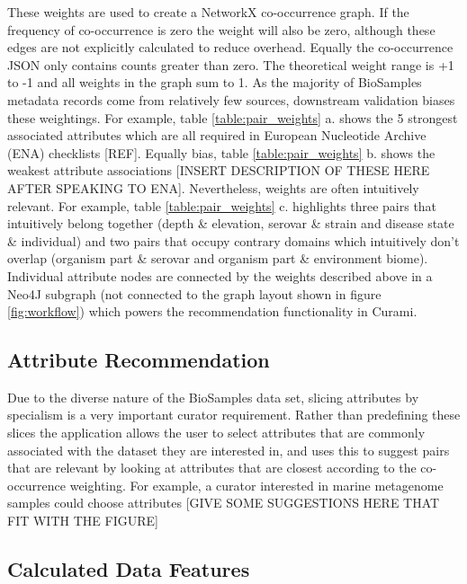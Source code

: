\documentclass{bmcart}
\begin{document}
These weights are used to create a NetworkX co-occurrence graph. If the frequency of co-occurrence is zero the weight will also be zero, although these edges are not explicitly calculated to reduce overhead. Equally the co-occurrence JSON only contains counts greater than zero. The theoretical weight range is +1 to -1 and all weights in the graph sum to 1. As the majority of BioSamples metadata records come from relatively few sources, downstream validation biases these weightings. For example, table \ref{table:pair_weights} a. shows the 5 strongest associated attributes which are all required in European Nucleotide Archive (ENA) checklists [REF]. Equally bias, table \ref{table:pair_weights} b. shows the weakest attribute associations [INSERT DESCRIPTION OF THESE HERE AFTER SPEAKING TO ENA]. Nevertheless, weights are often intuitively relevant. For example, table \ref{table:pair_weights} c. highlights three pairs that intuitively belong together (depth \& elevation, serovar \& strain and disease state \& individual) and two pairs that occupy contrary domains which intuitively don't overlap (organism part \& serovar and organism part \& environment biome). Individual attribute nodes are connected by the weights described above in a Neo4J subgraph (not connected to the graph layout shown in figure \ref{fig:workflow}) which powers the recommendation functionality in Curami.

\subsection*{Attribute Recommendation}

Due to the diverse nature of the BioSamples data set, slicing attributes by specialism is a very important curator requirement. Rather than predefining these slices the application allows the user to select attributes that are commonly associated with the dataset they are interested in, and uses this to suggest pairs that are relevant by looking at attributes that are closest according to the co-occurrence weighting. For example, a curator interested in marine metagenome samples could choose attributes [GIVE SOME SUGGESTIONS HERE THAT FIT WITH THE FIGURE]



\subsection*{Calculated Data Features}
\end{document}

